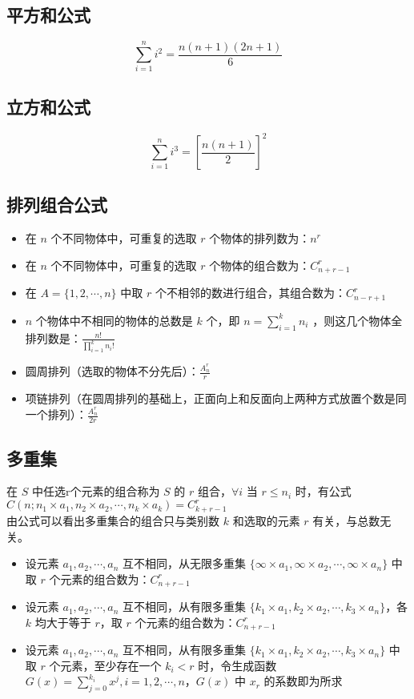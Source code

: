 \subsection{平方和公式}
$$
\sum_{i=1}^n i^2 = \frac{n(n+1)(2n+1)}{6}
$$
\subsection{立方和公式}
$$
\sum_{i=1}^n i^3 = \left[\frac{n(n+1)}{2}\right]^2
$$
\subsection{排列组合公式}
\begin{itemize}
	\item 在 $n$ 个不同物体中，可重复的选取 $r$ 个物体的排列数为：$n^r$
	\item 在 $n$ 个不同物体中，可重复的选取 $r$ 个物体的组合数为：$C_{n+r-1}^r$
	\item 在 $A=\{1, 2, \cdots, n\}$ 中取 $r$ 个不相邻的数进行组合，其组合数为：$C_{n-r+1}^r$
	\item  $n$ 个物体中不相同的物体的总数是 $k$ 个，即 $n=\sum_{i=1}^k n_i$ ，则这几个物体全排列数是：$\frac{n!}{\prod_{i=1}^k n_i!}$
	\item 圆周排列（选取的物体不分先后）：$\frac{A_n^r}{r}$
	\item 项链排列（在圆周排列的基础上，正面向上和反面向上两种方式放置个数是同一个排列）：$\frac{A_n^r}{2r}$
\end{itemize}
\subsection{多重集}
在 $S$ 中任选r个元素的组合称为 $S$ 的 $r$ 组合，$\forall i$ 当 $r \leq n_i$ 时，有公式$C(n; n_1 \times a_1, n_2 \times a_2, \cdots, n_k \times a_k)=C_{k + r - 1}^r$ \\
\hspace*{0.7cm} 由公式可以看出多重集合的组合只与类别数 $k$ 和选取的元素 $r$ 有关，与总数无关。
\begin{itemize}
	\item 设元素 $a_1, a_2, \cdots, a_n$ 互不相同，从无限多重集 $\{\infty \times a_1, \infty \times a_2, \cdots, \infty \times a_n\}$ 中取 $r$ 个元素的组合数为：$C_{n + r - 1}^r$
	\item 设元素 $a_1, a_2, \cdots, a_n$ 互不相同，从有限多重集 $\{k_1 \times a_1, k_2 \times a_2, \cdots, k_3 \times a_n\}$，各 $k$ 均大于等于 $r$，取 $r$ 个元素的组合数为：$C_{n + r - 1}^r$
	\item 设元素 $a_1, a_2, \cdots, a_n$ 互不相同，从有限多重集 $\{k_1 \times a_1, k_2 \times a_2, \cdots, k_3 \times a_n\}$ 中取 $r$ 个元素，至少存在一个 $k_i < r$ 时，令生成函数 $G(x) = \sum_{j = 0}^{k_i} x^j, i = 1, 2, \cdots, n$，$G(x)$ 中 $x_r$ 的系数即为所求
\end{itemize}
